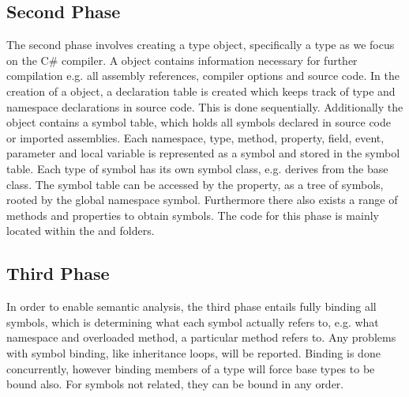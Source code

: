 \subsection{Second Phase}
The second phase involves creating a  type object, specifically a  type as we focus on the C\# compiler. A  object contains information necessary for further compilation e.g. all assembly references, compiler options and source code. In the creation of a  object, a declaration table is created which keeps track of type and namespace declarations in source code\cite{sadovRoslynPerf}. This is done sequentially\cite{sadovRoslynPerf}. Additionally the  object contains a symbol table, which holds all symbols declared in source code or imported assemblies. Each namespace, type, method, property, field, event, parameter and local variable is represented as a symbol and stored in the symbol table\cite[p. 14]{ng2012roslyn}. Each type of symbol has its own symbol class, e.g.  derives from the base  class. The symbol table can be accessed by the  property, as a tree of symbols, rooted by the global namespace symbol. Furthermore there also exists a range of methods and properties to obtain symbols. The code for this phase is mainly located within the  and  folders.

\subsection{Third Phase}
In order to enable semantic analysis, the third phase entails fully binding all symbols, which is determining what each symbol actually refers to, e.g. what namespace and overloaded method, a particular method refers to. Any problems with symbol binding, like inheritance loops, will be reported. Binding is done concurrently, however binding members of a type will force base types to be bound also. For symbols not related, they can be bound in any order.\cite{sadovRoslynPerf}

